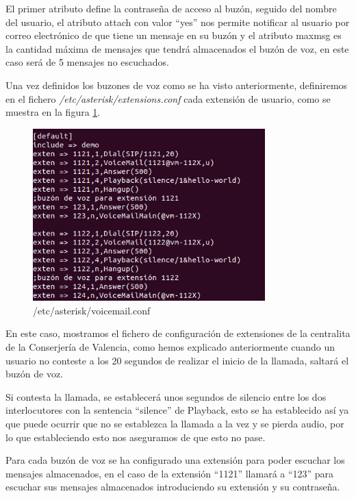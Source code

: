 \documentclass[a4paper]{article}
\begin{document}
 El primer atributo define la contraseña de acceso al buzón, seguido del nombre del usuario, el atributo attach con valor ``yes'' nos permite notificar al usuario por correo electrónico de que tiene un mensaje en su buzón y el atributo maxmsg es la cantidad máxima de mensajes que tendrá almacenados el buzón de voz, en este caso será de 5 mensajes no escuchados.


 Una vez definidos los buzones de voz como se ha visto anteriormente, definiremos en el fichero \textit{/etc/asterisk/extensions.conf} cada extensión de usuario, como se muestra en la figura \ref{fig:extensions.conf}.

\newpage
\begin{figure}
    \begin{center}
        \includegraphics[width=0.8\textwidth]{extens+buzon.png}
         \caption{/etc/asterisk/voicemail.conf}
         \label{fig:extensions.conf}
    \end{center}
\end{figure}

En este caso, mostramos el fichero de configuración de extensiones de la centralita de la Conserjería de Valencia, como hemos explicado anteriormente cuando un usuario no conteste a los 20 segundos de realizar el inicio de la llamada, saltará el buzón de voz. 

  Si contesta la llamada, se establecerá unos segundos de silencio entre los dos interlocutores con la sentencia ``silence'' de Playback, esto se ha establecido así ya que puede ocurrir que no se establezca la llamada a la vez y se pierda audio, por lo que estableciendo esto nos aseguramos de que esto no pase.

 
Para cada buzón de voz se ha configurado una extensión para poder escuchar los mensajes almacenados, en el caso de la extensión ``1121'' llamará a ``123'' para escuchar sus mensajes almacenados introduciendo su extensión y su contraseña.
\end{document}
